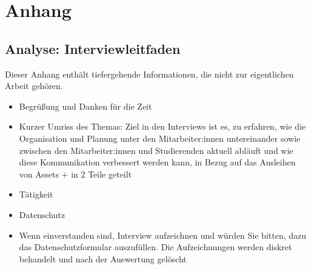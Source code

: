 
\chapter{Anhang}


\section{Analyse: Interviewleitfaden}
\label{appendix:interview}

Dieser Anhang enthält tiefergehende Informationen, die nicht zur eigentlichen Arbeit gehören.

\begin{itemize}
    \item Begrüßung und Danken für die Zeit
    \item Kurzer Umriss des Themas: Ziel in den Interviews ist es, zu erfahren, wie die Organisation
    und Planung unter den Mitarbeiter:innen untereinander sowie zwischen den Mitarbeiter:innen und
    Studierenden aktuell abläuft und wie diese Kommunikation verbessert werden kann, in Bezug auf
    das Ausleihen von Assets + in 2 Teile geteilt
    \item Tätigkeit 
    \item Datenschutz 
    \item Wenn einverstanden sind, Interview aufzeichnen und würden Sie bitten, dazu das
    Datenschutzformular auszufüllen. Die Aufzeichnungen werden diskret behandelt und nach der
    Auswertung gelöscht
\end{itemize}

